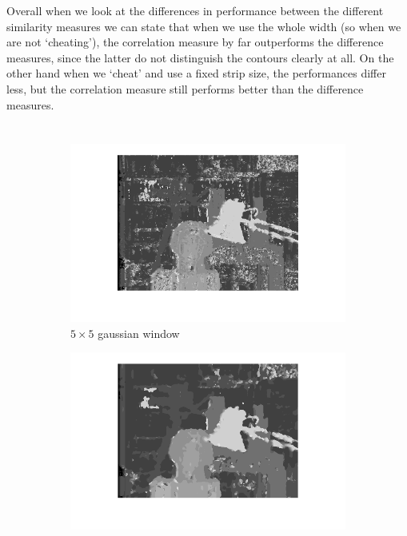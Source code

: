\documentclass{article}
\begin{document}
Overall when we look at the differences in performance between the different similarity measures we can state that when we use the whole width (so when we are not `cheating'), the correlation measure by far outperforms the difference measures, since the latter do not distinguish the contours clearly at all. On the other hand when we `cheat' and use a fixed strip size, the performances differ less, but the correlation measure still performs better than the difference measures. 

\section{}

\begin{figure}[ht!]
 \centering
 \begin{subfigure}{.3\textwidth}
  \centering
  \includegraphics[width=\linewidth]{ex3/a5_5g.png}
  \caption{$5\times5$ gaussian window}
  \label{fig_a1}
 \end{subfigure}
 \begin{subfigure}{.3\textwidth}
  \centering
  \includegraphics[width=\linewidth]{ex3/a10_10g.png}

\end{subfigure}
\end{figure}
\end{document}

